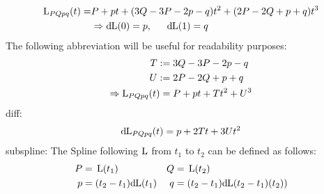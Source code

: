 	$$\begin{aligned}
		\operatorname{L}_{PQpq}(t) =& P + pt + (3Q-3P-2p-q)t^2 + (2P-2Q+p+q)t^3 \\
		&\Rightarrow {\rm d}\hspace{-2pt}\operatorname{L}(0) = p,\phantom{--} {\rm d}\hspace{-2pt}\operatorname{L}(1) = q \\
	\end{aligned}$$
	The following abbreviation will be useful for readability purposes:
	$$\begin{aligned}
		T :=&\phantom{.} 3Q-3P-2p-q \\
		U :=&\phantom{.} 2P-2Q+p+q \\
		\Rightarrow \operatorname{L}_{PQpq}(t) =&\phantom{.} P + pt + Tt^2 + U^3 \\
	\end{aligned}$$
	diff:
	$$\begin{aligned}
		{\rm d}\hspace{-2pt}\operatorname{L}_{PQpq}(t) = p + 2Tt + 3Ut^2 \\
	\end{aligned}$$
	subspline:
	The Spline following $\operatorname{L}$ from $t_1$ to $t_2$ can be defined as follows:
	$$\begin{aligned}
		P =&\phantom{.} \operatorname{L}(t_1) & Q =&\phantom{.} \operatorname{L}(t_2) \\
		p =&\phantom{.} (t_2-t_1){\rm d}\hspace{-2pt}\operatorname{L}(t_1) & q =&\phantom{.} (t_2-t_1){\rm d}\hspace{-2pt}\operatorname{L}(t_2-t_1)(t_2)) \\
	\end{aligned}$$
